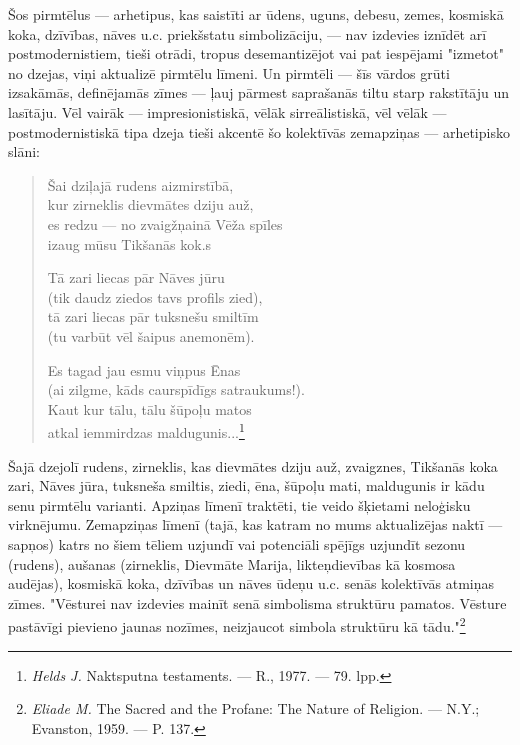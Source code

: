 \documentclass[11pt]{article}
\begin{document}
Šos pirmtēlus --- arhetipus, kas saistīti ar ūdens,
uguns, debesu, zemes, kosmiskā koka, dzīvības, nāves
u.c. priekšstatu simbolizāciju, --- nav izdevies
iznīdēt arī postmodernistiem, tieši otrādi,
tropus desemantizējot vai pat iespējami "izmetot"
no dzejas, viņi aktualizē pirmtēlu līmeni.
Un pirmtēli --- šīs vārdos grūti izsakāmās,
definējamās zīmes --- ļauj pārmest saprašanās tiltu
starp rakstītāju un lasītāju. Vēl vairāk ---
impresionistiskā, vēlāk sirreālistiskā, vēl vēlāk ---
postmodernistiskā tipa dzeja tieši akcentē šo
kolektīvās zemapziņas --- arhetipisko slāni:

\begin{quote}
Šai dziļajā rudens aizmirstībā,\\
kur zirneklis dievmātes dziju auž,\\
es redzu --- no zvaigžņainā Vēža spīles\\
izaug mūsu Tikšanās kok.s

Tā zari liecas pār Nāves jūru\\
(tik daudz ziedos tavs profils zied),\\
tā zari liecas pār tuksnešu smiltīm\\
(tu varbūt vēl šaipus anemonēm).

Es tagad jau esmu viņpus Ēnas\\
(ai zilgme, kāds caurspīdīgs satraukums!).\\
Kaut kur tālu, tālu šūpoļu matos\\
atkal iemmirdzas maldugunis...\footnote{{\em Helds J.
} Naktsputna testaments. --- R., 1977. --- 79. lpp.}
\end{quote}

Šajā dzejolī rudens, zirneklis, kas dievmātes dziju
auž, zvaigznes, Tikšanās koka zari, Nāves jūra,
tuksneša smiltis, ziedi, ēna, šūpoļu mati,
maldugunis ir kādu senu pirmtēlu varianti.
Apziņas līmenī traktēti, tie veido šķietami
neloģisku virknējumu. Zemapziņas līmenī
(tajā, kas katram no mums aktualizējas
naktī --- sapņos) katrs no šiem tēliem uzjundī
vai potenciāli spējīgs uzjundīt sezonu
(rudens), aušanas (zirneklis, Dievmāte Marija,
likteņdievības kā kosmosa audējas), kosmiskā
koka, dzīvības un nāves ūdeņu u.c.
senās kolektīvās atmiņas zīmes.
"Vēsturei nav izdevies mainīt senā simbolisma
struktūru pamatos. Vēsture pastāvīgi pievieno
jaunas nozīmes, neizjaucot simbola struktūru
kā tādu."\footnote{{\em Eliade M.} The Sacred
and the Profane: The Nature of Religion. ---
N.Y.; Evanston, 1959. --- P. 137.}
\end{document}
